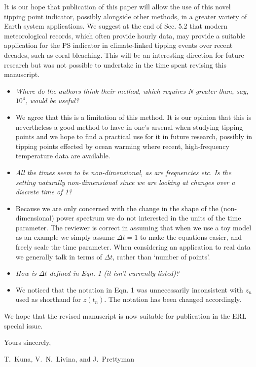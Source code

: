 \documentclass[12pt, a4paper]{article}
\begin{document}
It is our hope that publication of this paper will allow the use of this novel tipping point indicator, possibly alongside other methods, in a greater variety of Earth system applications. We suggest at the end of Sec. 5.2 that modern meteorological records, which often provide hourly data, may provide a suitable application for the PS indicator in climate-linked tipping events over recent decades, such as coral bleaching. This will be an interesting direction for future research but was not possible to undertake in the time spent revising this manuscript. 

\begin{itemize}

\item[\bf Comment 1.]  %
{\sl Where do the authors think their method, which requires N greater than, say, $10^4$, would be useful?
}

\item[\bf Response.] We agree that this is a limitation of this method. It is our opinion that this is nevertheless a good method to have in one’s arsenal when studying tipping points and we hope to find a practical use for it in future research, possibly in tipping points effected by ocean warming where recent, high-frequency temperature data are available. 

\item[\bf Comment 2.]
{\sl All the times seem to be non-dimensional, as are frequencies etc. Is the setting naturally non-dimensional since we are looking at changes over a discrete time of 1?
}

\item[\bf Response.] Because we are only concerned with the change in the shape of the (non-dimensional) power spectrum we do not interested in the units of the time parameter. The reviewer is correct in assuming that when we use a toy model as an example we simply assume $\Delta t = 1$ to make the equations easier, and freely scale the time parameter. When considering an application to real data we generally talk in terms of $\Delta t$, rather than ‘number of points’. 

\item[\bf Comment 3.] %
{\sl How is $\Delta t$ defined in Eqn. 1 (it isn’t currently listed)?
}

\item[\bf Response.] We noticed that the notation in Eqn. 1 was unnecessarily inconsistent with $z_n$ used as shorthand for $z(t_n)$. The notation has been changed accordingly. 


\end{itemize}

\vspace{7mm}

\noindent
We hope that the revised manuscript is now suitable for publication
in the ERL special issue.

\vspace{5mm}

\noindent
Yours sincerely,

\vspace{1mm}

\noindent
T.~Kuna, V.~N.~Livina, and J.~Prettyman
\end{document}
